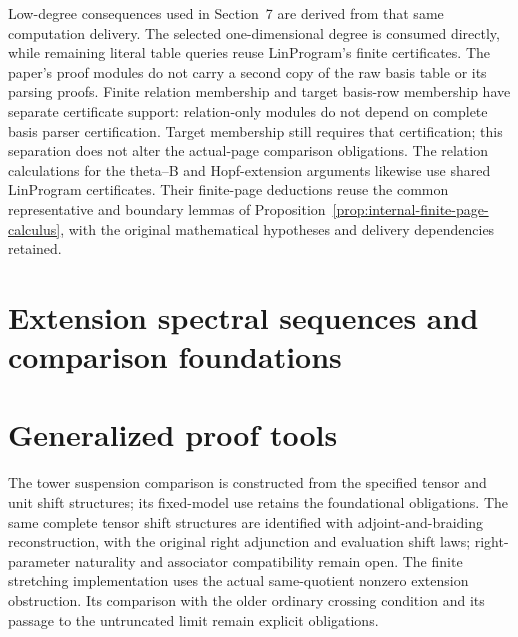 Low-degree consequences used in Section~7 are derived from that same
computation delivery. The selected one-dimensional degree is consumed
directly, while remaining literal table queries reuse LinProgram's finite
certificates. The paper's proof modules do not carry a second copy of the
raw basis table or its parsing proofs.
Finite relation membership and target basis-row membership have separate
certificate support: relation-only modules do not depend on complete basis
parser certification. Target membership still requires that certification;
this separation does not alter the actual-page comparison obligations.
The relation calculations for the theta--B and Hopf-extension arguments
likewise use shared LinProgram certificates. Their finite-page deductions
reuse the common representative and boundary lemmas of
Proposition~\ref{prop:internal-finite-page-calculus}, with the original
mathematical hypotheses and delivery dependencies retained.





\chapter{Extension spectral sequences and comparison foundations}
\label{chap:extension-spectral-sequences-main}






\chapter{Generalized proof tools}
\label{chap:generalized-tools-main}
The tower suspension comparison is constructed from the specified tensor and
unit shift structures; its fixed-model use retains the foundational obligations.
The same complete tensor shift structures are identified with adjoint-and-braiding
reconstruction, with the original right adjunction and evaluation shift laws;
right-parameter naturality and associator compatibility remain open.
The finite stretching implementation uses the actual same-quotient nonzero
extension obstruction. Its comparison with the older ordinary crossing
condition and its passage to the untruncated limit remain explicit obligations.


